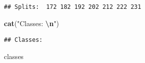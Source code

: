 \documentclass[
]{article}
\newenvironment{Shaded}{\begin{snugshade}}{\end{snugshade}}
\newcommand{\FunctionTok}[1]{\textcolor[rgb]{0.13,0.29,0.53}{\textbf{#1}}}
\newcommand{\NormalTok}[1]{#1}
\newcommand{\SpecialCharTok}[1]{\textcolor[rgb]{0.81,0.36,0.00}{\textbf{#1}}}
\newcommand{\StringTok}[1]{\textcolor[rgb]{0.31,0.60,0.02}{#1}}
\begin{document}
\begin{verbatim}
## Splits:  172 182 192 202 212 222 231
\end{verbatim}

\begin{Shaded}
\begin{Highlighting}[]
\FunctionTok{cat}\NormalTok{(}\StringTok{"Classes: }\SpecialCharTok{\textbackslash{}n}\StringTok{"}\NormalTok{)}
\end{Highlighting}
\end{Shaded}

\begin{verbatim}
## Classes:
\end{verbatim}

\begin{Shaded}
\begin{Highlighting}[]
\NormalTok{classes}
\end{Highlighting}
\end{Shaded}
\end{document}
